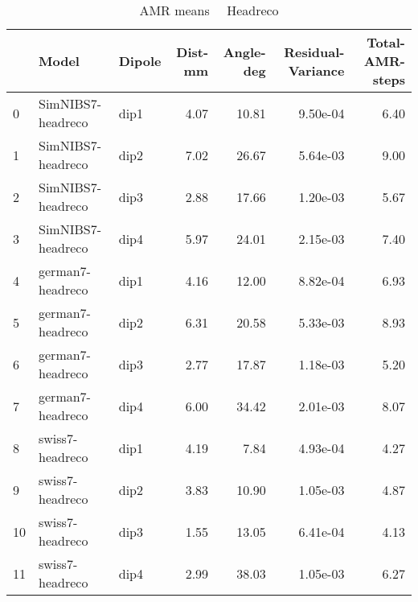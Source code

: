 \documentclass{article}
\begin{document}
\begin{table}
\begin{tabular}{lllrrrr}
\toprule
& Model& Dipole& Dist-mm& Angle-deg& Residual-Variance& Total-AMR-steps\\
\midrule
\rowcolor{lightgray}0 & SimNIBS7-headreco & dip1 & 4.07 & 10.81 & 9.50e-04 & 6.40\\
\rowcolor{lightgray}1 & SimNIBS7-headreco & dip2 & 7.02 & 26.67 & 5.64e-03 & 9.00\\
\rowcolor{lightgray}2 & SimNIBS7-headreco & dip3 & 2.88 & 17.66 & 1.20e-03 & 5.67\\
\rowcolor{lightgray}3 & SimNIBS7-headreco & dip4 & 5.97 & 24.01 & 2.15e-03 & 7.40\\
\rowcolor{yellow}4 & german7-headreco & dip1 & 4.16 & 12.00 & 8.82e-04 & 6.93\\
\rowcolor{yellow}5 & german7-headreco & dip2 & 6.31 & 20.58 & 5.33e-03 & 8.93\\
\rowcolor{yellow}6 & german7-headreco & dip3 & 2.77 & 17.87 & 1.18e-03 & 5.20\\
\rowcolor{yellow}7 & german7-headreco & dip4 & 6.00 & 34.42 & 2.01e-03 & 8.07\\
\rowcolor{pink}8 & swiss7-headreco & dip1 & 4.19 & 7.84 & 4.93e-04 & 4.27\\
\rowcolor{pink}9 & swiss7-headreco & dip2 & 3.83 & 10.90 & 1.05e-03 & 4.87\\
\rowcolor{pink}10 & swiss7-headreco & dip3 & 1.55 & 13.05 & 6.41e-04 & 4.13\\
\rowcolor{pink}11 & swiss7-headreco & dip4 & 2.99 & 38.03 & 1.05e-03 & 6.27\\
\end{tabular}
\caption{AMR means \ \textemdash \ Headreco}
\end{table}
\end{document}
